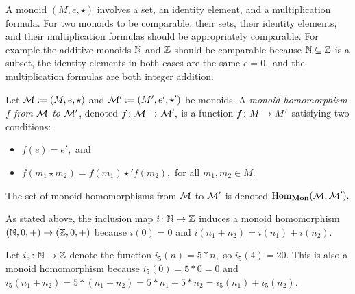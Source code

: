 \documentclass[CT4S-EN-RU]{subfiles}
\begin{document}
\begin{blockENG}
A monoid $(M,e,\star)$ involves a set, an identity element, and a multiplication formula. For two monoids to be comparable, their sets, their identity elements, and their multiplication formulas should be appropriately comparable. For example the additive monoids $\NN$ and $\ZZ$ should be comparable because ${\mathbb N}\subseteq{\mathbb Z}$ is a subset, the identity elements in both cases are the same $e=0,$ and the multiplication formulas are both integer addition.
\end{blockENG}

\begin{definitionENG}\label{def:monoid hom}
Let $\mathcal{M}:=(M,e,\star)$ and $\mathcal{M}':=(M',e',\star')$ be monoids. A {\em monoid homomorphism $f$ from $\mathcal{M}$ to $\mathcal{M}'$}, denoted $f\colon\mathcal{M}\rightarrow\mathcal{M}',$ is a function $f\colon M\rightarrow M'$ satisfying two conditions:
\begin{itemize}
\item $f(e)=e',$ and
\item $f(m_1\star m_2)=f(m_1)\star'f(m_2),$ for all $m_1,m_2\in M.$
\end{itemize}
The set of monoid homomorphisms from $\mathcal{M}$ to $\mathcal{M}'$ is denoted $\operatorname{Hom}_{{\mathbf{Mon}}}(\mathcal{M},\mathcal{M}').$
\end{definitionENG}

\begin{definitionRUS}\label{def:monoid hom}
\end{definitionRUS}

\begin{exampleENG}[From $\NN$ to $\ZZ$]\label{ex:nat to int}
As stated above, the inclusion map $i\colon{\mathbb N}\rightarrow{\mathbb Z}$ induces a monoid homomorphism $({\mathbb N},0,+)\rightarrow({\mathbb Z},0,+)$ because $i(0)=0$ and $i(n_1+n_2)=i(n_1)+i(n_2).$

Let $i_5\colon{\mathbb N}\rightarrow{\mathbb Z}$ denote the function $i_5(n)=5*n,$ so $i_5(4)=20.$ This is also a monoid homomorphism because $i_5(0)=5*0=0$ and $i_5(n_1+n_2)=5*(n_1+n_2)=5*n_1+5*n_2=i_5(n_1)+i_5(n_2).$
\end{exampleENG}

\begin{exampleRUS}[From $\NN$ to $\ZZ$]\label{ex:nat to int}
\end{exampleRUS}
\end{document}
